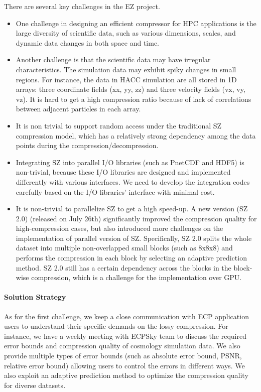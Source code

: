 There are several key challenges in the EZ project.
\begin{itemize}
\item One challenge in designing an efficient compressor for HPC applications is the large
diversity of scientific data, such as various dimensions, scales, and dynamic data changes in both
space and time.
\item Another challenge is that the scientific data may have irregular characteristics. The simulation data may exhibit spiky changes in small regions. For instance, the data in HACC simulation are all stored in 1D arrays: three coordinate fields (xx, yy, zz) and three velocity fields (vx, vy, vz). It is hard to get a high compression ratio because of lack of correlations between adjacent particles in each array.
\item It is non trivial to support random access under the traditional SZ compression model, which has a relatively strong dependency among the data points during the compression/decompression. 
\item Integrating SZ into parallel I/O libraries (such as PnetCDF and HDF5) is non-trivial, because these I/O libraries are designed and implemented differently with various interfaces. We need to develop the integration codes carefully based on the I/O libraries' interface with minimal cost.
\item It is non-trivial to parallelize SZ to get a high speed-up. A new version (SZ 2.0) (released on July 26th) significantly improved the compression quality for high-compression cases, but also introduced more challenges on the implementation of parallel version of SZ. Specifically, SZ 2.0 splits the whole dataset into multiple non-overlapped small blocks (such as 8x8x8) and performs the compression in each block by selecting an adaptive prediction method. SZ 2.0 still has a certain dependency across the blocks in the block-wise compression, which is a challenge for the implementation over GPU. 

\end{itemize}

\paragraph{Solution Strategy}

As for the first challenge, we keep a close communication with ECP application users to understand their specific demands on the lossy compression. For instance, we have a weekly meeting with ECPSky team to discuss the required error bounds and compression quality of cosmology simulation data. We also provide multiple types of error bounds (such as absolute error bound, PSNR, relative error bound) allowing users to control the errors in different ways. We also exploit an adaptive prediction method to optimize the compression quality for diverse datasets. 

